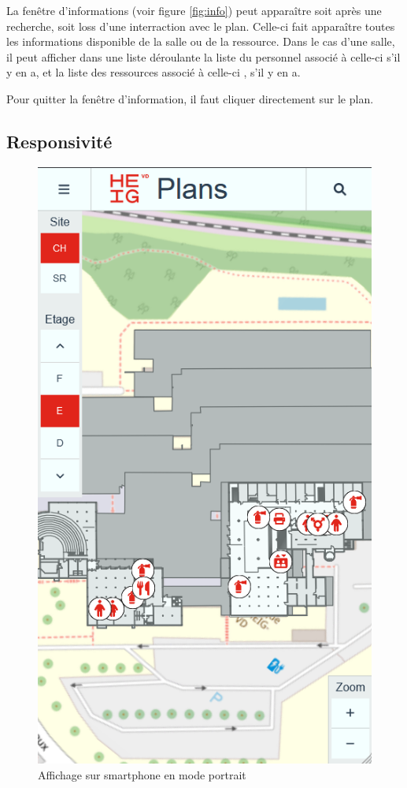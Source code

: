 \documentclass[
    iai, %
    il, %
]{heig-tb}
\begin{document}
La fenêtre d'informations (voir figure \ref{fig:info}) peut apparaître soit après une recherche, soit loss d'une interraction avec le plan.
Celle-ci fait apparaître toutes les informations disponible de la salle ou de la ressource.
Dans le cas d'une salle, il peut afficher dans une liste déroulante la liste du personnel associé à celle-ci s'il y en a,
et la liste des ressources associé à celle-ci , s'il y en a.

Pour quitter la fenêtre d'information, il faut cliquer directement sur le plan.

\subsection{Responsivité}

\begin{figure}[h]
    \centering
    \includegraphics[scale=0.5]{frontend-responsive-portrait.png}
    \caption{Affichage sur smartphone en mode portrait}
\end{figure}
\end{document}

